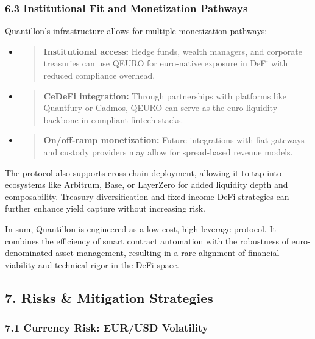 \hypertarget{institutional-fit-and-monetization-pathways}{%
\subsubsection{6.3 Institutional Fit and Monetization
Pathways}\label{institutional-fit-and-monetization-pathways}}

Quantillon's infrastructure allows for multiple monetization pathways:

\begin{itemize}
\item
  \begin{quote}
  \textbf{Institutional access:} Hedge funds, wealth managers, and
  corporate treasuries can use QEURO for euro-native exposure in DeFi
  with reduced compliance overhead.
  \end{quote}
\item
  \begin{quote}
  \textbf{CeDeFi integration:} Through partnerships with platforms like
  Quantfury or Cadmos, QEURO can serve as the euro liquidity backbone in
  compliant fintech stacks.
  \end{quote}
\item
  \begin{quote}
  \textbf{On/off-ramp monetization:} Future integrations with fiat
  gateways and custody providers may allow for spread-based revenue
  models.
  \end{quote}
\end{itemize}

The protocol also supports cross-chain deployment, allowing it to tap
into ecosystems like Arbitrum, Base, or LayerZero for added liquidity
depth and composability. Treasury diversification and fixed-income DeFi
strategies can further enhance yield capture without increasing risk.

In sum, Quantillon is engineered as a low-cost, high-leverage protocol.
It combines the efficiency of smart contract automation with the
robustness of euro-denominated asset management, resulting in a rare
alignment of financial viability and technical rigor in the DeFi space.

\hypertarget{risks-mitigation-strategies}{%
\subsection{7. Risks \& Mitigation
Strategies}\label{risks-mitigation-strategies}}

\hypertarget{currency-risk-eurusd-volatility}{%
\subsubsection{7.1 Currency Risk: EUR/USD
Volatility}\label{currency-risk-eurusd-volatility}}

